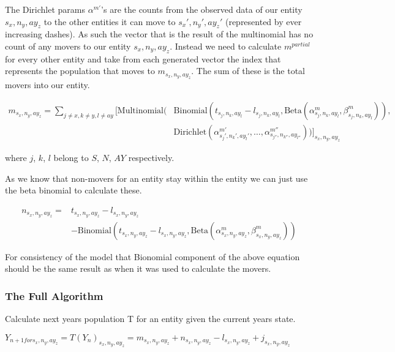 \documentclass[margin=5mm]{article}
\begin{document}
The Dirichlet params $\alpha^{m'}$'s are the counts from the observed
data of our entity ${s_x,n_y,ay_z}$ to the other entities it can move
to ${s_x',n_y',ay_z'}$ (represented by ever increasing dashes).  As
such the vector that is the result of the multinomial has no count of
any movers to our entity ${s_x,n_y,ay_z}$.  Instead we need to
calculate $m^{partial}$ for every other entity and take from each
generated vector the index that represents the population that moves
to $m_{s_x,n_y,ay_z}$.  The sum of these is the total movers into our
entity.

\begin{equation*}
  \begin{split}
    m_{s_x,n_y,ay_z} = \sum_{j \neq x, k \neq y , l \neq ay }\bigg[
        \text{Multinomial}( & \text{Binomial}(t_{s_j,n_k,ay_l} - l_{s_j,n_k,ay_l}, 
        \text{Beta}(\alpha^m_{s_j,n_k,ay_l},\beta^m_{s_j,n_k,ay_l})),
        \\ &  \text{Dirichlet}(\alpha^{m'}_{s_j',n_k',ay_l'}, \dots,
        \alpha^{m''}_{s_{j''},n_{k''},ay_{l''}}))\bigg]_{s_x,n_y,ay_z}
\end{split}
\end{equation*}

where $j$, $k$, $l$ belong to $S$, $N$, $AY$ respectively.

As we know that non-movers for an entity stay within the entity we can
just use the beta binomial to calculate these.

\begin{equation*}
  \begin{split}
    n_{s_x,n_y,ay_z} = & t_{s_x,n_y,ay_z}
    - l_{s_x,n_y,ay_z} \\ & - \text{Binomial}(t_{s_x,n_y,ay_z} - l_{s_x,n_y,ay_z}, 
\text{Beta}(\alpha^m_{s_x,n_y,ay_z},\beta^m_{s_x,n_y,ay_z}))
\end{split}
\end{equation*}

For consistency of the model that Bionomial component of the above
equation should be the same result as when it was used to calculate
the movers.

\subsubsection{The Full Algorithm}

Calculate next years population T for an entity given the current
years state.

$Y_{n+1 for s_x,n_y,ay_z} = T(Y_n)_{s_x,n_y,ay_z} = m_{s_x,n_y,ay_z} + n_{s_x,n_y,ay_z} -
l_{s_x,n_y,ay_z} + j_{s_x,n_y,ay_z} $
\end{document}

